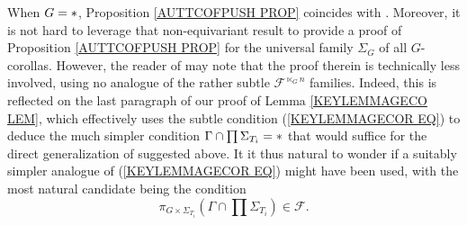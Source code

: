 \documentclass[a4paper,10pt]{article}%
\begin{document}
\begin{remark}
When $G=\**$, Proposition \ref{AUTTCOFPUSH PROP}
coincides with \cite[Lemma 5.9]{BM08}.
Moreover, it is not hard to leverage that non-equivariant result to provide a proof of Proposition \ref{AUTTCOFPUSH PROP} for the universal family $\Sigma_G$ of all $G$-corollas.
However, the reader of \cite{BM08} may note that the proof therein is technically less involved, using no analogue of the rather subtle $\mathcal{F}^{\ltimes_G n}$ families.
Indeed, this is reflected 
on the last paragraph of our proof of Lemma \ref{KEYLEMMAGECO LEM}, which effectively 
uses the subtle condition (\ref{KEYLEMMAGECOR EQ})
to deduce the much simpler condition
$\Gamma \cap \prod \Sigma_{T_i} = \**$
that would suffice for the direct generalization of \cite[Lemma 5.9]{BM08} suggested above.
It it thus natural to wonder if a suitably simpler analogue
of (\ref{KEYLEMMAGECOR EQ}) might have been used, with the most natural candidate being the condition  
\begin{equation}\label{WRONGCONJ}
\pi_{G \times \Sigma_{T_i}}(\Gamma \cap \prod \Sigma_{T_i})
\in   \mathcal{F}.
\end{equation}


\end{remark}
\end{document}

